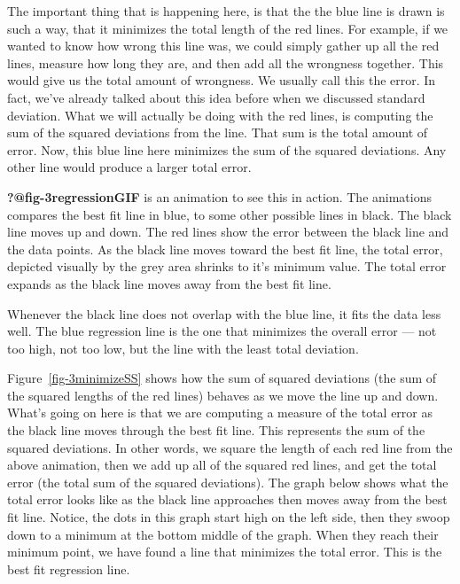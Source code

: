 \documentclass[
  letterpaper,
  DIV=11,
  numbers=noendperiod]{scrreprt}
\begin{document}
The important thing that is happening here, is that the the blue line is
drawn is such a way, that it minimizes the total length of the red
lines. For example, if we wanted to know how wrong this line was, we
could simply gather up all the red lines, measure how long they are, and
then add all the wrongness together. This would give us the total amount
of wrongness. We usually call this the error. In fact, we've already
talked about this idea before when we discussed standard deviation. What
we will actually be doing with the red lines, is computing the sum of
the squared deviations from the line. That sum is the total amount of
error. Now, this blue line here minimizes the sum of the squared
deviations. Any other line would produce a larger total error.

\textbf{?@fig-3regressionGIF} is an animation to see this in action. The
animations compares the best fit line in blue, to some other possible
lines in black. The black line moves up and down. The red lines show the
error between the black line and the data points. As the black line
moves toward the best fit line, the total error, depicted visually by
the grey area shrinks to it's minimum value. The total error expands as
the black line moves away from the best fit line.

Whenever the black line does not overlap with the blue line, it fits the
data less well. The blue regression line is the one that minimizes the
overall error --- not too high, not too low, but the line with the least
total deviation.

Figure~\ref{fig-3minimizeSS} shows how the sum of squared deviations
(the sum of the squared lengths of the red lines) behaves as we move the
line up and down. What's going on here is that we are computing a
measure of the total error as the black line moves through the best fit
line. This represents the sum of the squared deviations. In other words,
we square the length of each red line from the above animation, then we
add up all of the squared red lines, and get the total error (the total
sum of the squared deviations). The graph below shows what the total
error looks like as the black line approaches then moves away from the
best fit line. Notice, the dots in this graph start high on the left
side, then they swoop down to a minimum at the bottom middle of the
graph. When they reach their minimum point, we have found a line that
minimizes the total error. This is the best fit regression line.
\end{document}
